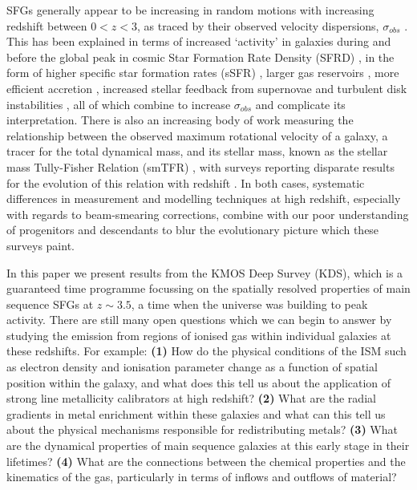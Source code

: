 \documentclass[fleqn,usenatbib]{mn2e}
\begin{document}
SFGs generally appear to be increasing in random motions with increasing redshift between $0 < z < 3$, as traced by their observed velocity dispersions, $\sigma_{obs}$ \citep{Genzel2008,ForsterSchreiber2009,Law2009,Cresci2009,Gnerucci2011,Epinat2012,Kassin2012,Green2014,Wisnioski2015,Stott2016}.
This has been explained in terms of increased `activity' in galaxies during and before the global peak in cosmic Star Formation Rate Density (SFRD) \citep{Madau_2014}, in the form of higher specific star formation rates (sSFR) \citep{Wisnioski2015}, larger gas reservoirs \citep{Law2009,ForsterSchreiber2009,Wisnioski2015,Stott2016}, more efficient accretion \citep{Law2009}, increased stellar feedback from supernovae \citep{Kassin2012} and turbulent disk instabilities \citep{Law2009,Bournaud2007,Bournaud2016}, all of which combine to increase $\sigma_{obs}$ and complicate its interpretation.
There is also an increasing body of work measuring the relationship between the observed maximum rotational velocity of a galaxy, a tracer for the total dynamical mass, and its stellar mass, known as the stellar mass Tully-Fisher Relation (smTFR) \citep{Tully1977}, with surveys reporting disparate results for the evolution of this relation with redshift \citep[e.g.][]{Puech2008,Miller2011,Gnerucci2011,Tiley2016a,Harrison2017}.
In both cases, systematic differences in measurement and modelling techniques at high redshift, especially with regards to beam-smearing corrections, combine with our poor understanding of progenitors and descendants to blur the evolutionary picture which these surveys paint.

In this paper we present results from the KMOS Deep Survey (KDS), which is a guaranteed time programme focussing on the spatially resolved properties of main sequence SFGs at $z\sim3.5$, a time when the universe was building to peak activity.
There are still many open questions which we can begin to answer by studying the emission from regions of ionised gas within individual galaxies at these redshifts.
For example: \textbf{(1)} How do the physical conditions of the ISM such as electron density and ionisation parameter change as a function of spatial position within the galaxy, and what does this tell us about the application of strong line metallicity calibrators at high redshift?
\textbf{(2)} What are the radial gradients in metal enrichment within these galaxies and what can this tell us about the physical mechanisms responsible for redistributing metals?
\textbf{(3)} What are the dynamical properties of main sequence galaxies at this early stage in their lifetimes? 
\textbf{(4)} What are the connections between the chemical properties and the kinematics of the gas, particularly in terms of inflows and outflows of material?
\end{document}
